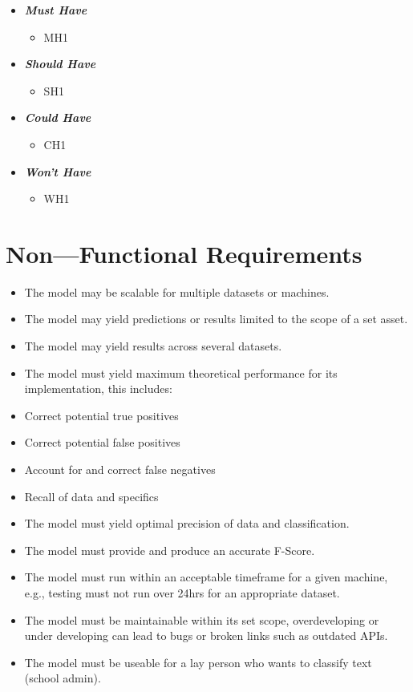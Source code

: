 \begin{itemize}
    \item \textbf{\textit{Must Have}}
        \begin{itemize}\label{FMH}
            \item MH1
        \end{itemize}
    \item \textbf{\textit{Should Have}}
        \begin{itemize}\label{FSH}
            \item SH1
        \end{itemize}
    \item \textbf{\textit{Could Have}}
        \begin{itemize}\label{FCH}
            \item CH1
        \end{itemize}
    \item \textbf{\textit{Won't Have}}
        \begin{itemize}\label{FWH}
            \item WH1
        \end{itemize}
\end{itemize}

\section{Non---Functional Requirements}

\begin{itemize}
    \item The model may be scalable for multiple datasets or machines.
    \item The model may yield predictions or results limited to the scope of a set asset.
    \item The model may yield results across several datasets.
    \item The model must yield maximum theoretical performance for its implementation, this includes:
    \item Correct potential true positives
    \item Correct potential false positives
    \item Account for and correct false negatives
    \item Recall of data and specifics
    \item The model must yield optimal precision of data and classification.
    \item The model must provide and produce an accurate F-Score.
    \item The model must run within an acceptable timeframe for a given machine, e.g., testing must not run over 24hrs for an appropriate dataset.
    \item The model must be maintainable within its set scope, overdeveloping or under developing can lead to bugs or broken links such as outdated APIs.
    \item The model must be useable for a lay person who wants to classify text (school admin).
\end{itemize}

